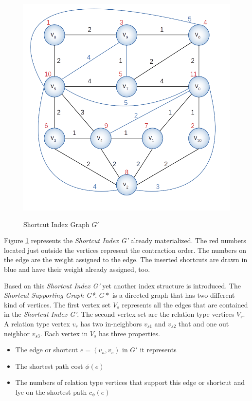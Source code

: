 \documentclass[twocolumn]{article}
\begin{document}
\begin{figure}[h]
    \caption{Shortcut Index Graph $G'$}
    \centering
    \includegraphics[width=\linewidth]{cchGraph}
    \label{fig:shortcutIndex}
\end{figure}

Figure \ref{fig:shortcutIndex} represents the \textit{Shortcut Index G'} already materialized. The red numbers
located just outside the vertices represent the contraction order. The numbers on the edge are the weight
assigned to the edge. The inserted shortcuts are drawn in blue and have their weight already assigned, too.

Based on this \textit{Shortcut Index G'} yet another index structure is introduced. The \textit{Shortcut Supporting Graph G*}.
$G*$ is a directed graph that has two different kind of vertices. The first vertex set $V_s$ represents all the
edges that are contained in the \textit{Shortcut Index G'}. The second vertex set are the relation type 
vertices $V_r$. A relation type vertex $v_r$ has two in-neighbors $v_{s1}$ and $v_{s2}$ that and one 
out neighbor $v_{s3}$. Each vertex in $V_s$ has three properties. 

\begin{itemize}
    \item The edge or shortcut $e = (v_u, v_v)$ in $G'$ it represents
    \item The shortest path cost $\phi(e)$ 
    \item The numbers of relation type vertices that support this edge or shortcut and lye on the shortest path $c_{\phi}(e)$
\end{itemize}
\end{document}
